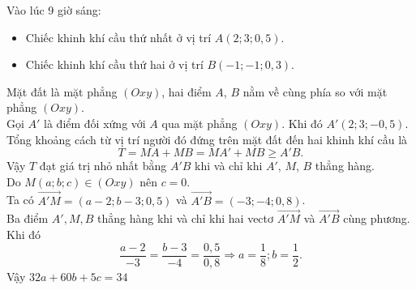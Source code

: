 \begin{ex}
{\begin{center}
	\end{center}
Vào lúc 9 giờ sáng:
\begin{itemize}
\item Chiếc khinh khí cầu thứ nhất ở vị trí $A(2;3;0{,}5)$.
\item Chiếc khinh khí cầu thứ hai ở vị trí $B(-1;-1;0{,}3)$.
\end{itemize}
Mặt đất là mặt phẳng $(Oxy)$, hai điểm $A$, $B$ nằm về cùng phía so với mặt phẳng $(Oxy)$. \\
Gọi  $A'$ là điểm đối xứng với $A$ qua mặt phẳng $(Oxy)$. 
Khi đó $A'(2;3;-0,5)$. \\
Tổng khoảng cách từ vị trí người đó đứng trên mặt đất đến hai khinh khí cầu là
$$T=MA+MB=MA'+MB \geq A'B.$$
Vậy $T$ đạt giá trị nhỏ nhất bằng $A'B$ khi và chỉ khi $A'$, $M$, $B$ thẳng hàng. \\
Do $M(a;b;c) \in (Oxy) $ nên $c=0$. \\
Ta có $\vec{A'M} = (a-2;b-3;0,5)$ và $\vec{A'B} = (-3;-4;0,8)$. \\
Ba điểm $A',M,B$ thẳng hàng khi và chỉ khi hai vectơ $\vec{A'M}$ và $\vec{A'B}$ cùng phương. Khi đó 
$$\dfrac{a-2}{-3} = \dfrac{b-3}{-4} = \dfrac{0,5}{0,8} \Rightarrow a=\dfrac{1}{8}; b=\dfrac{1}{2}.$$
Vậy $32a+60b+5c = 34$
}
\end{ex}

